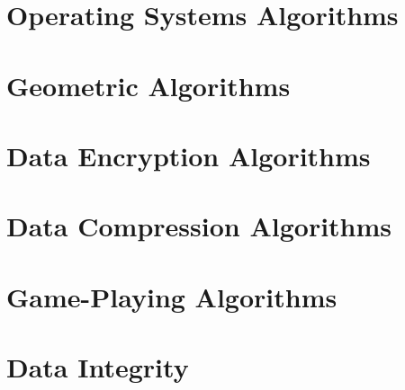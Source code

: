 \documentclass[12pt]{book}
\begin{document}

\section{Operating Systems Algorithms}



\section{Geometric Algorithms}



\section{Data Encryption Algorithms}
%


\section{Data Compression Algorithms}



\section{Game-Playing Algorithms}



\section{Data Integrity}



\printindex

\end{document}
